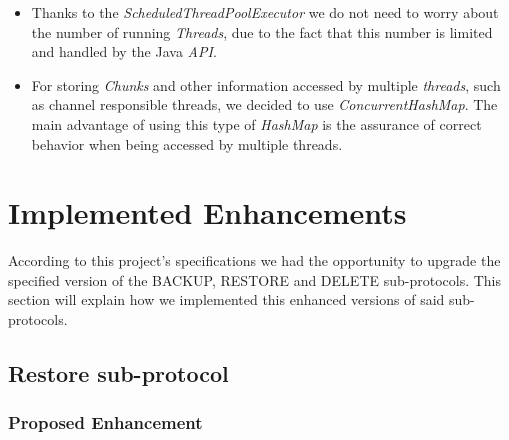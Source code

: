 \documentclass[a4paper]{article}
\begin{document}
\begin{itemize}
\begin{lstlisting}[language=Java, caption=\textit{Peer} Class \textit{backup} Method]
    ArrayList<Chunk> chunks = file.getChunks();

    for (Chunk chunk : chunks) {
        byte[] message = generatePutChunkMessage(chunk, this.protocolVersion, this.peerID, chunk.getFileID(), chunk.getNumber(), replication);
        this.scheduler.execute(new MessageSenderManagerThread(message, "MDB", this));
        this.scheduler.schedule(new ConfirmationCollectorThread(this, message, replication), 1, TimeUnit.SECONDS);
    }
}
\end{lstlisting}
        
\begin{lstlisting}[language=Java, caption=\textit{MessageSenderManagerThread} Class \textit{run} Method]
@Override
public void run() {
    System.out.println(this.getInfo());
    this.peer.getChannel(this.channelKey).sendMessage(this.message);
}
\end{lstlisting}
        
        \item Thanks to the \textit{ScheduledThreadPoolExecutor} we do not need to worry about the number of running \textit{Threads}, due to the fact that this number is limited and handled by the Java \textit{API}.
        
        \item For storing \textit{Chunks} and other information accessed by multiple \textit{threads}, such as channel responsible threads, we decided to use \textit{ConcurrentHashMap}. The main advantage of using this type of \textit{HashMap} is the assurance of correct behavior when being accessed by multiple threads.
    \end{itemize}

\section{Implemented Enhancements}

    According to this project's specifications we had the opportunity to upgrade the specified version of the BACKUP, RESTORE and DELETE sub-protocols. This section will explain how we implemented this enhanced versions of said sub-protocols.
    
    \subsection{Restore sub-protocol}
    
        \subsubsection{Proposed Enhancement}
        
\end{document}
